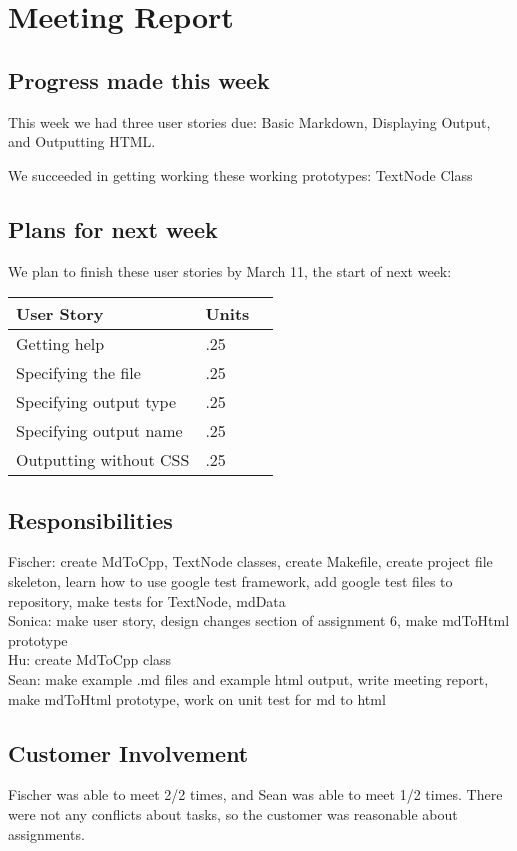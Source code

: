 \section{Meeting Report}

\subsection{Progress made this week}
This week we had three user stories due: Basic Markdown, Displaying Output, and Outputting HTML. 

We succeeded in getting working these working prototypes: 
TextNode Class


\subsection{Plans for next week}
We plan to finish these user stories by March 11, the start of next week:

 \begin{center}
    \begin{tabular}{ | l | l | p{5cm} |}
    \hline
    User Story & Units \\ \hline
    Getting help & .25 \\ \hline
    Specifying the file & .25 \\ \hline
    Specifying output type & .25 \\ \hline
    Specifying output name & .25 \\ \hline
    Outputting without CSS & .25 \\ \hline
    \end{tabular}
\end{center}


\subsection{Responsibilities}
Fischer: create MdToCpp, TextNode classes, create Makefile, create project file skeleton, learn how to use google test framework, add google test files to repository, make tests for TextNode, mdData \\
Sonica: make user story, design changes section of assignment 6, make mdToHtml prototype\\
Hu: create MdToCpp class\\
Sean: make example .md files and example html output, write meeting report, make mdToHtml prototype, work on unit test for md to html\\

\subsection{Customer Involvement}
Fischer was able to meet 2/2 times, and Sean was able to meet 1/2 times.
There were not any conflicts about tasks, so the customer was reasonable about assignments.

